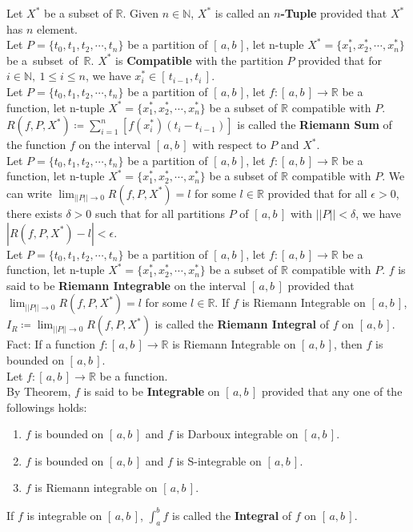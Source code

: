 \documentclass[11pt]{article}
\newcommand{\R}{\mathbb{R}}
\newcommand{\N}{\mathbb{N}}
\newcommand{\fact}{\color{gray}Fact: \color{black}}
\newcommand{\Intab}{[\,a,b\,]}
\begin{document}
		\noindent Let $X^*$ be a subset of $\R$. Given $n \in \N$, $X^*$ is called an \textbf{$n$-Tuple} provided that $X^*$ has $n$ element.\\
		
		\noindent Let $P = \{ t_0,t_1,t_2,\cdots ,t_n \}$ be a partition of $[\,a,b\,]$, let n-tuple $X^*=\{x_1^*,x_2^*, \cdots , x_n^*\}$ be \mbox{a subset of $\R$.} $X^*$ is \textbf{Compatible} with the partition $P$ provided that for $i \in \N, \ 1\leq i \leq n$, we have $x_i^* \in [\, t_{i-1},t_i \,]$.\\
		
		\noindent Let $P = \{ t_0,t_1,t_2,\cdots ,t_n \}$ be a partition of $[\,a,b\,]$, let $f:[\,a,b\,]\to \R$ be a function, let n-tuple $X^*=\{x_1^*,x_2^*, \cdots , x_n^*\}$ be a subset of $\R$ compatible with $P$. $R(f,P,X^*) \coloneqq \sum_{i=1}^n [f(x_i^*)(t_i-t_{i-1})]$ is called the \textbf{Riemann Sum} of the function $f$ on the interval $\Intab$ with respect to $P$ and $X^*$.\\
		
		\noindent Let $P = \{ t_0,t_1,t_2,\cdots ,t_n \}$ be a partition of $[\,a,b\,]$, let $f:[\,a,b\,]\to \R$ be a function, let n-tuple $X^*=\{x_1^*,x_2^*, \cdots , x_n^*\}$ be a subset of $\R$ compatible with $P$. We can write $\lim_{||P|| \to 0} R(f,P,X^*) = l$ for some $l \in \R$ provided that for all $\epsilon >0$, there exists $\delta >0$ such that for all partitions $P$ of $\Intab$ with $||P||<\delta$, we have $|R(f,P,X^*)-l|<\epsilon$.\\
		
		\noindent Let $P = \{ t_0,t_1,t_2,\cdots ,t_n \}$ be a partition of $[\,a,b\,]$, let $f:[\,a,b\,]\to \R$ be a function, let n-tuple $X^*=\{x_1^*,x_2^*, \cdots , x_n^*\}$ be a subset of $\R$ compatible with $P$. $f$ is said to be \textbf{Riemann Integrable} on the interval $\Intab$ provided that $\lim_{||P|| \to 0} R(f,P,X^*)=l$ for some $l \in \R$. If $f$ is Riemann Integrable on $\Intab$, $I_R \coloneqq \lim_{||P|| \to 0} R(f,P,X^*)$ is called the \textbf{Riemann Integral} of $f$ on $\Intab$.\\
		\fact If a function $f:[\,a,b\,]\to \R$ is Riemann Integrable on $\Intab$, then $f$ is bounded on $\Intab$.\\
		
		\noindent Let $f:[\,a,b\,]\to \R$ be a function.\\By Theorem, $f$ is said to be \textbf{Integrable} on $\Intab$ provided that any one of the followings holds:
		\begin{enumerate}[topsep=3pt,itemsep=-1ex,partopsep=1ex,parsep=1ex]
			\item $f$ is bounded on $\Intab$ and $f$ is Darboux integrable on $\Intab$.
			\item $f$ is bounded on $\Intab$ and $f$ is S-integrable on $\Intab$.
			\item $f$ is Riemann integrable on $\Intab$.
		\end{enumerate}
		\noindent If $f$ is integrable on $\Intab$, $\int_a^b f$ is called the \textbf{Integral} of $f$ on $\Intab$.\\
		
\end{document}
